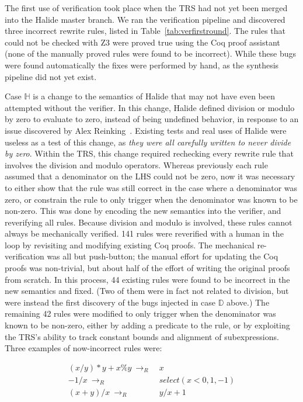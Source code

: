 \documentclass[acmsmall,review,anonymous]{acmart}\settopmatter{printfolios=true,printccs=false,printacmref=false}
\newcommand{\rewrites}[0]{\:\rightarrow_{R}\:}
\begin{document}
The first use of verification took place when the TRS had not yet been merged into the Halide master branch. We ran the verification pipeline and discovered three incorrect rewrite rules, listed in Table~\ref{tab:verfirstround}. The rules that could not be checked with Z3 were proved true using the Coq proof assistant (none of the manually proved rules were found to be incorrect). While these bugs were found automatically the fixes were performed by hand, as the synthesis pipeline did not yet exist. 

Case $\mathbb{H}$ is a change to the semantics of Halide that may not have even been attempted without the verifier. In this change, Halide defined division or modulo by zero to evaluate to zero, instead of being undefined behavior, in response to an issue discovered by Alex Reinking~\cite{reinkingthesis}. Existing tests and real uses of Halide were useless as a test of this change, as \emph{they were all carefully written to never divide by zero}. Within the TRS, this change required rechecking every rewrite rule that involves the division and modulo operators. Whereas previously each rule assumed that a denominator on the LHS could not be zero, now it was necessary to either show that the rule was still correct in the case where a denominator was zero, or constrain the rule to only trigger when the denominator was known to be non-zero. This was done by encoding the new semantics into the verifier, and reverifying all rules. Because division and modulo is involved, these rules cannot always be mechanically verified. 141 rules were reverified with a human in the loop by revisiting and modifying existing Coq proofs. The mechanical re-verification was all but push-button; the manual effort for updating the Coq proofs was non-trivial, but about half of the effort of writing the original proofs from scratch. In this process, 44 existing rules were found to be incorrect in the new semantics and fixed. (Two of them were in fact not related to division, but were instead the first discovery of the bugs injected in case $\mathbb{D}$ above.) The remaining 42 rules were modified to only trigger when the denominator was known to be non-zero, either by adding a predicate to the rule, or by exploiting the TRS’s ability to track constant bounds and alignment of subexpressions. Three examples of now-incorrect rules were:

\begin{align*}
(x/y)*y + x\%y \rewrites & x \\
  -1 / x \rewrites & select(x < 0, 1, -1) \\
(x + y)/x \rewrites & y/x + 1
\end{align*}
\end{document}

